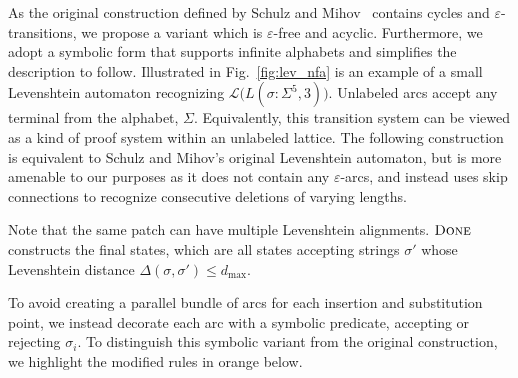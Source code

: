 \documentclass[popl.tex]{subfiles}
\begin{document}
As the original construction defined by Schulz and Mihov~\cite{schulz2002fast} contains cycles and $\varepsilon$-transitions, we propose a variant which is $\varepsilon$-free and acyclic. Furthermore, we adopt a symbolic form that supports infinite alphabets and simplifies the description to follow. Illustrated in Fig.~\ref{fig:lev_nfa} is an example of a small Levenshtein automaton recognizing $\mathcal{L}\big(L(\sigma: \Sigma^5, 3)\big)$. Unlabeled arcs accept any terminal from the alphabet, $\Sigma$. Equivalently, this transition system can be viewed as a kind of proof system within an unlabeled lattice. The following construction is equivalent to Schulz and Mihov's original Levenshtein automaton, but is more amenable to our purposes as it does not contain any $\varepsilon$-arcs, and instead uses skip connections to recognize consecutive deletions of varying lengths.



Note that the same patch can have multiple Levenshtein alignments. $\textsc{Done}$ constructs the final states, which are all states accepting strings $\sigma'$ whose Levenshtein distance $\Delta(\sigma, \sigma') \leq d_{\max}$.

To avoid creating a parallel bundle of arcs for each insertion and substitution point, we instead decorate each arc with a symbolic predicate, accepting or rejecting $\sigma_i$. To distinguish this symbolic variant from the original construction, we highlight the modified rules in orange below.

\end{document}
